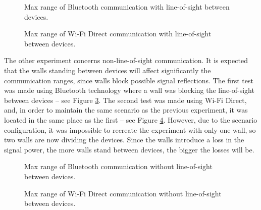 \begin{figure}[ht]
   \noindent{}
	\caption{\label{fig:btMaxVisib} Max range of Bluetooth communication with line-of-sight between devices.}
\end{figure}

\begin{figure}[ht]
   \noindent{}
	\caption{\label{fig:wfdMaxVisib} Max range of Wi-Fi Direct communication with line-of-sight between devices.}
\end{figure}

The other experiment concerns non-line-of-sight communication. It is expected that the walls standing between devices will affect significantly the communication ranges, since walls block possible signal reflections. The first test was made using Bluetooth technology where a wall was blocking the line-of-sight between devices -- see Figure \ref{fig:btMaxInv}. The second test was made using Wi-Fi Direct, and, in order to maintain the same scenario as the previous experiment, it was located in the same place as the first -- see Figure \ref{fig:wfdMaxInv}. However, due to the scenario configuration, it was impossible to recreate the experiment with only one wall, so two walls are now dividing the devices. Since the walls introduce a loss in the signal power, the more walls stand between devices, the bigger the losses will be.

\begin{figure}[ht]
   \noindent{}
	\caption{\label{fig:btMaxInv} Max range of Bluetooth communication without line-of-sight between devices.}
\end{figure}

\begin{figure}[ht]
   \noindent{}
	\caption{\label{fig:wfdMaxInv} Max range of Wi-Fi Direct communication without line-of-sight between devices.}
\end{figure}

